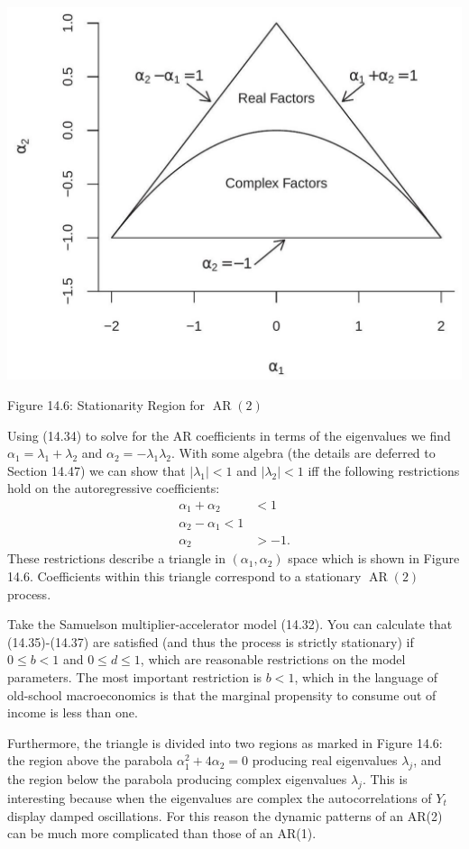 \documentclass[10pt]{article}
\begin{document}
\includegraphics[max width=\textwidth]{2022_10_23_6047885e7d154c9f28afg-29}

Figure 14.6: Stationarity Region for $\operatorname{AR}(2)$

Using (14.34) to solve for the AR coefficients in terms of the eigenvalues we find $\alpha_{1}=\lambda_{1}+\lambda_{2}$ and $\alpha_{2}=-\lambda_{1} \lambda_{2}$. With some algebra (the details are deferred to Section 14.47) we can show that $\left|\lambda_{1}\right|<1$ and $\left|\lambda_{2}\right|<1$ iff the following restrictions hold on the autoregressive coefficients:
$$
\begin{aligned}
\alpha_{1}+\alpha_{2} &<1 \\
\alpha_{2}-\alpha_{1}<1 \\
\alpha_{2} &>-1 .
\end{aligned}
$$
These restrictions describe a triangle in $\left(\alpha_{1}, \alpha_{2}\right)$ space which is shown in Figure 14.6. Coefficients within this triangle correspond to a stationary $\operatorname{AR}(2)$ process.

Take the Samuelson multiplier-accelerator model (14.32). You can calculate that (14.35)-(14.37) are satisfied (and thus the process is strictly stationary) if $0 \leq b<1$ and $0 \leq d \leq 1$, which are reasonable restrictions on the model parameters. The most important restriction is $b<1$, which in the language of old-school macroeconomics is that the marginal propensity to consume out of income is less than one.

Furthermore, the triangle is divided into two regions as marked in Figure 14.6: the region above the parabola $\alpha_{1}^{2}+4 \alpha_{2}=0$ producing real eigenvalues $\lambda_{j}$, and the region below the parabola producing complex eigenvalues $\lambda_{j}$. This is interesting because when the eigenvalues are complex the autocorrelations of $Y_{t}$ display damped oscillations. For this reason the dynamic patterns of an AR(2) can be much more complicated than those of an AR(1).
\end{document}
